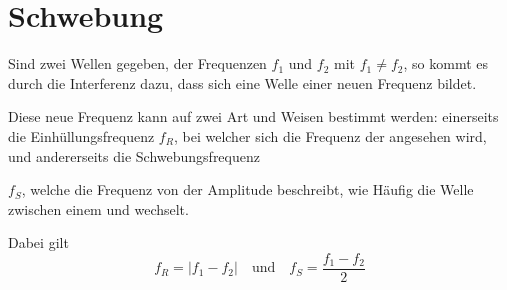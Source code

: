 \documentclass{article}
\begin{document}
\section{Schwebung}
\begin{minipage}{\dimexpr\linewidth-6.5cm} 
Sind zwei Wellen gegeben, der Frequenzen $f_1$ und $f_2$ mit ${f_1 \ne f_2}$, so kommt es durch die Interferenz dazu, dass sich eine Welle einer neuen Frequenz bildet.
 
Diese neue Frequenz kann auf zwei Art und Weisen bestimmt werden: einerseits die Einhüllungsfrequenz $f_R$, bei welcher sich die Frequenz der  angesehen wird, und andererseits die Schwebungsfrequenz \par \vspace{2pt}
 
\end{minipage}
\hfill 
\begin{minipage}{5.5cm}
 \center
\end{minipage}
 
\noindent $f_S$, welche die Frequenz von der Amplitude beschreibt, wie Häufig die Welle zwischen einem  und  wechselt. 
 
Dabei gilt
\[
 f_R = \vert f_1 - f_2 \vert
 \quad \text{und} \quad
 f_S = \frac{f_1 - f_2}{2} 
\] 
\end{document}

